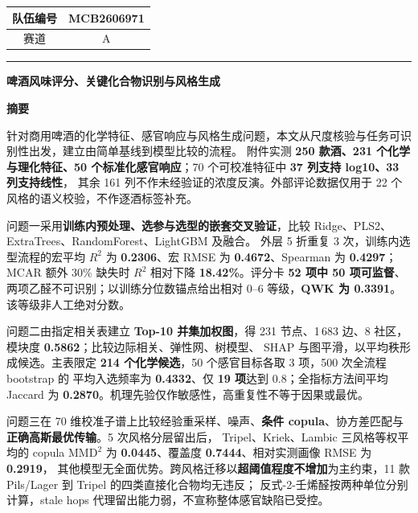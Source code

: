 \documentclass[UTF8,a4paper,zihao=-4]{ctexart}
\numberwithin{figure}{section}
\numberwithin{table}{section}
\numberwithin{equation}{section}
\begin{document}
\thispagestyle{empty}
\begin{center}
\begin{tabular}{|c|c|}
\hline
队伍编号 & MCB2606971 \\
\hline
赛道 & A \\
\hline
\end{tabular}
\end{center}
\vspace{0.8em}
\hrule
\vspace{0.8em}
\begin{center}
{\bfseries 啤酒风味评分、关键化合物识别与风格生成}
\end{center}
\vspace{0.2em}
\begin{center}
\textbf{ 摘\quad 要}
\end{center}

针对商用啤酒的化学特征、感官响应与风格生成问题，本文从尺度核验与任务可识别性出发，建立由简单基线到模型比较的流程。
附件实测 \textbf{250 款酒、231 个化学与理化特征、50 个标准化感官响应}；70 个可校准特征中 \textbf{37 列支持 log10、33 列支持线性}，
其余 161 列不作未经验证的浓度反演。外部评论数据仅用于 22 个风格的语义校验，不作逐酒标签补充。

问题一采用\textbf{训练内预处理、选参与选型的嵌套交叉验证}，比较 Ridge、PLS2、ExtraTrees、RandomForest、LightGBM 及融合。
外层 5 折重复 3 次，训练内选型流程的宏平均 $R^2$ 为 \textbf{0.2306}、宏 RMSE 为 \textbf{0.4672}、Spearman 为 \textbf{0.4297}；MCAR 额外 30\% 缺失时 
$R^2$ 相对下降 \textbf{18.42\%}。评分卡 \textbf{52 项中 50 项可监督}、两项乙醛不可识别；以训练分位数锚点给出相对 0--6 等级，\textbf{QWK 为 0.3391}。
该等级非人工绝对分数。

问题二由指定相关表建立 \textbf{Top-10 并集加权图}，得 231 节点、1\,683 边、8 社区，模块度 \textbf{0.5862}；比较边际相关、弹性网、树模型、
SHAP 与图平滑，以平均秩形成候选。主表限定 \textbf{214 个化学候选}，50 个感官目标各取 3 项，500 次全流程 bootstrap 的
平均入选频率为 \textbf{0.4332}、仅 \textbf{19 项}达到 0.8；全指标方法间平均 Jaccard 为 \textbf{0.2870}。机理先验仅作敏感性，高重复性不等于因果或最优。

问题三在 70 维校准子谱上比较经验重采样、噪声、\textbf{条件 copula}、协方差匹配与\textbf{正确高斯最优传输}。5 次风格分层留出后，
Tripel、Kriek、Lambic 三风格等权平均的 copula $\mathrm{MMD}^2$ 为 \textbf{0.0445}、覆盖度 \textbf{0.7444}、相对实测画像 RMSE 为 \textbf{0.2919}，
其他模型无全面优势。跨风格迁移以\textbf{超阈值程度不增加}为主约束，11 款 Pils/Lager 到 Tripel 的四类直接化合物均无违反；
反式-2-壬烯醛按两种单位分别计算，stale hops 代理留出能力弱，不宣称整体感官缺陷已受控。
\end{document}
